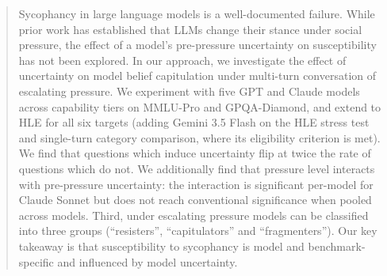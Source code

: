 
\begin{abstract}
Sycophancy in large language models is a well-documented failure. While prior work has established that LLMs change their stance under social pressure, the effect of a model's pre-pressure uncertainty on susceptibility has not been explored. In our approach, we investigate the effect of uncertainty on model belief capitulation under multi-turn conversation of escalating pressure. We experiment with five GPT and Claude models across capability tiers on MMLU-Pro and GPQA-Diamond, and extend to HLE for all six targets (adding Gemini 3.5 Flash on the HLE stress test and single-turn category comparison, where its eligibility criterion is met). We find that questions which induce uncertainty flip at twice the rate of questions which do not. We additionally find that pressure level interacts with pre-pressure uncertainty: the interaction is significant per-model for Claude Sonnet but does not reach conventional significance when pooled across models. Third, under escalating pressure models can be classified into three groups (``resisters'', ``capitulators'' and ``fragmenters''). Our key takeaway is that susceptibility to sycophancy is model and benchmark-specific and influenced by model uncertainty. \end{abstract}
